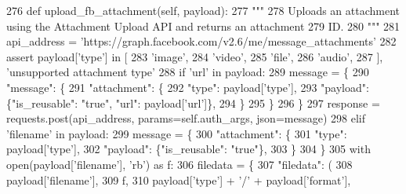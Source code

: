 \begin{DoxyCode}
276     \textcolor{keyword}{def }upload\_fb\_attachment(self, payload):
277         \textcolor{stringliteral}{"""}
278 \textcolor{stringliteral}{        Uploads an attachment using the Attachment Upload API and returns an attachment}
279 \textcolor{stringliteral}{        ID.}
280 \textcolor{stringliteral}{        """}
281         api\_address = \textcolor{stringliteral}{'https://graph.facebook.com/v2.6/me/message\_attachments'}
282         \textcolor{keyword}{assert} payload[\textcolor{stringliteral}{'type'}] \textcolor{keywordflow}{in} [
283             \textcolor{stringliteral}{'image'},
284             \textcolor{stringliteral}{'video'},
285             \textcolor{stringliteral}{'file'},
286             \textcolor{stringliteral}{'audio'},
287         ], \textcolor{stringliteral}{'unsupported attachment type'}
288         \textcolor{keywordflow}{if} \textcolor{stringliteral}{'url'} \textcolor{keywordflow}{in} payload:
289             message = \{
290                 \textcolor{stringliteral}{"message"}: \{
291                     \textcolor{stringliteral}{"attachment"}: \{
292                         \textcolor{stringliteral}{"type"}: payload[\textcolor{stringliteral}{'type'}],
293                         \textcolor{stringliteral}{"payload"}: \{\textcolor{stringliteral}{"is\_reusable"}: \textcolor{stringliteral}{"true"}, \textcolor{stringliteral}{"url"}: payload[\textcolor{stringliteral}{'url'}]\},
294                     \}
295                 \}
296             \}
297             response = requests.post(api\_address, params=self.auth\_args, json=message)
298         \textcolor{keywordflow}{elif} \textcolor{stringliteral}{'filename'} \textcolor{keywordflow}{in} payload:
299             message = \{
300                 \textcolor{stringliteral}{"attachment"}: \{
301                     \textcolor{stringliteral}{"type"}: payload[\textcolor{stringliteral}{'type'}],
302                     \textcolor{stringliteral}{"payload"}: \{\textcolor{stringliteral}{"is\_reusable"}: \textcolor{stringliteral}{"true"}\},
303                 \}
304             \}
305             with open(payload[\textcolor{stringliteral}{'filename'}], \textcolor{stringliteral}{'rb'}) \textcolor{keyword}{as} f:
306                 filedata = \{
307                     \textcolor{stringliteral}{"filedata"}: (
308                         payload[\textcolor{stringliteral}{'filename'}],
309                         f,
310                         payload[\textcolor{stringliteral}{'type'}] + \textcolor{stringliteral}{'/'} + payload[\textcolor{stringliteral}{'format'}],

\end{DoxyCode}
